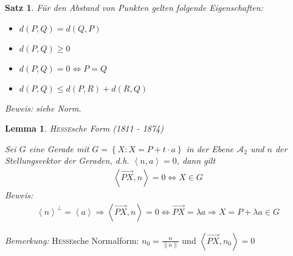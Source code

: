 \documentclass[%
a4paper,
11pt,		%
twoside,
]
{scrartcl}
\newcommand{\ora}{\overrightarrow}
\theoremstyle{plain}
\theoremstyle{plain}
\newtheorem{mysatz}[mydef]{Satz}
\theoremstyle{plain}
\newtheorem{mylemma}[mydef]{Lemma}
\theoremstyle{plain}
\theoremstyle{plain}
\begin{document}
\begin{mysatz}
    Für den Abstand von Punkten gelten folgende Eigenschaften:
    \begin{itemize}
        \item[(i)] $d(P,Q) = d(Q,P)$
        \item[(ii)] $d(P,Q) \geq 0$
        \item[(iii)] $d(P,Q) = 0 \Leftrightarrow P = Q$
        \item[(iv)] $d(P,Q) \leq d(P,R) + d(R,Q)$
    \end{itemize}
    \textit{Beweis:} siehe Norm.
\end{mysatz}

\begin{mylemma}
    \textsc{Hesse}sche Form (1811 - 1874)

    Sei $G$ eine Gerade mit $G = \left\{ X : X = P+t \cdot a \right\}$ in der Ebene $\mathcal{A}_2$ und $n$ der Stellungsvektor der Geraden, d.h. $\left\langle n,a \right\rangle=0$, dann gilt
    \begin{align*}
        \left\langle \ora{PX} , n \right\rangle = 0 \Leftrightarrow X \in G
    \end{align*}
    \textit{Beweis:}
    \begin{align*}
        \left\langle n \right\rangle^{\bot} = \left\langle a \right\rangle \Rightarrow \left\langle \ora{PX} , n \right\rangle = 0 \Leftrightarrow \ora{PX} = \lambda a \Rightarrow X = P + \lambda a \in G
    \end{align*}
\end{mylemma}
\textit{Bemerkung:} \textsc{Hesse}sche Normalform: $n_0 = \frac{n}{\| n \|}$ und $\left\langle \ora{PX} , n_0 \right\rangle = 0$
\end{document}
